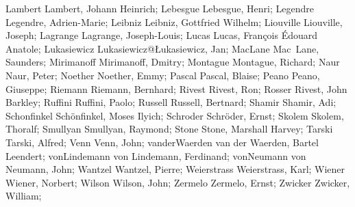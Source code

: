 \DefFriend Lambert          Lambert, Johann Heinrich;
\DefFriend Lebesgue         Lebesgue, Henri;
\DefFriend Legendre         Legendre, Adrien-Marie;
\DefFriend Leibniz          Leibniz, Gottfried Wilhelm;
\DefFriend Liouville        Liouville, Joseph;
\DefFriend Lagrange         Lagrange, Joseph-Louis;
\DefFriend Lucas            Lucas, François Édouard Anatole;
\DefFriend Lukasiewicz      Lukasiewicz@Łukasiewicz, Jan;
\DefFriend MacLane          Mac~Lane, Saunders;
\DefFriend Mirimanoff       Mirimanoff, Dmitry;
\DefFriend Montague         Montague, Richard;
\DefFriend Naur             Naur, Peter;
\DefFriend Noether          Noether, Emmy;
\DefFriend Pascal           Pascal, Blaise;
\DefFriend Peano            Peano, Giuseppe;
\DefFriend Riemann          Riemann, Bernhard;
\DefFriend Rivest           Rivest, Ron;
\DefFriend Rosser           Rivest, John Barkley;
\DefFriend Ruffini          Ruffini, Paolo;
\DefFriend Russell          Russell, Bertnard;
\DefFriend Shamir           Shamir, Adi;
\DefFriend Schonfinkel      Schönfinkel, Moses Ilyich;
\DefFriend Schroder         Schröder, Ernst;
\DefFriend Skolem           Skolem, Thoralf;
\DefFriend Smullyan         Smullyan, Raymond;
\DefFriend Stone            Stone, Marshall Harvey;
\DefFriend Tarski           Tarski, Alfred;
\DefFriend Venn             Venn, John;
\DefFriend vanderWaerden    van der Waerden, Bartel Leendert;
\DefFriend vonLindemann     von Lindemann, Ferdinand;
\DefFriend vonNeumann       von Neumann, John;
\DefFriend Wantzel          Wantzel, Pierre;
\DefFriend Weierstrass      Weierstrass, Karl;
\DefFriend Wiener           Wiener, Norbert;
\DefFriend Wilson           Wilson, John;
\DefFriend Zermelo          Zermelo, Ernst;
\DefFriend Zwicker          Zwicker, William;
